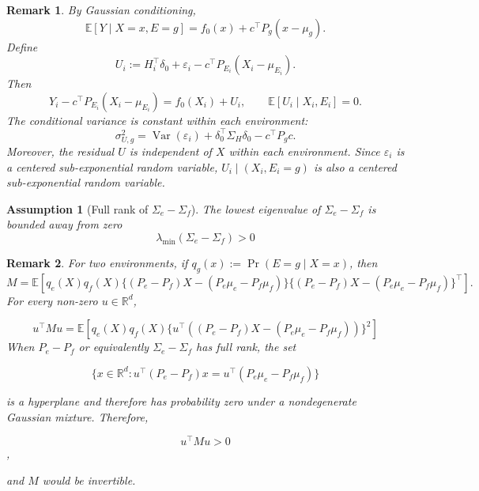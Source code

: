 \documentclass[11pt]{article}
\newtheorem{remark}{Remark}[section]
\newtheorem{assumption}{Assumption}
\newcommand{\R}{\mathbb{R}}
\newcommand{\E}{\mathbb{E}}
\newcommand{\eps}{\varepsilon}
\begin{document}
\begin{remark}
By Gaussian conditioning,
\begin{equation}
 \E[Y\mid X=x,E=g]=f_0(x)+c^\top P_g(x-\mu_g).
 \label{eq:conditional_mean_confounding}
\end{equation}
Define
\begin{equation}
 U_i:=H_i^\top\delta_0+\eps_i-c^\top P_{E_i}(X_i-\mu_{E_i}).
 \label{eq:corrected_error}
\end{equation}
Then
\[
 Y_i-c^\top P_{E_i}(X_i-\mu_{E_i})=f_0(X_i)+U_i,
 \qquad \E[U_i\mid X_i,E_i]=0.
\]
The conditional variance is constant within each environment:
\begin{equation}
 \sigma_{U,g}^2
 =\operatorname{Var}(\eps_i)+\delta_0^\top\Sigma_H\delta_0-c^\top P_gc.
 \label{eq:environment_variance}
\end{equation}
Moreover, the residual $U$ is independent of $X$ within each environment. Since $\eps_i$ is a centered sub-exponential random variable, $U_i\mid(X_i,E_i=g)$ is also a centered sub-exponential random variable.

\end{remark}

\begin{assumption} 
[Full rank of $\Sigma_e - \Sigma_f$]\label{assump:full_rank_of_cov_mat_diff}
The lowest eigenvalue of $\Sigma_e - \Sigma_f$ is bounded away from zero
\begin{equation}
 \lambda_{\min}(\Sigma_e - \Sigma_f) > 0
 \label{eq:full_rank_of_cov_mat_diff}
\end{equation}
\end{assumption}

\begin{remark}
For two environments, if $q_g(x):=\Pr(E=g\mid X=x)$, then
\[
 M=\E\!\left[q_e(X)q_f(X)\{(P_e-P_f)X -(P_e\mu_e - P_f\mu_f) \}\{(P_e-P_f)X -(P_e\mu_e - P_f\mu_f)\}^\top\right].
\]
\noindent
For every non-zero $u \in \R^d$,

\[u^\top M u = \E[q_e(X)q_f(X)\{u^\top\left((P_e-P_f)X -(P_e\mu_e - P_f\mu_f)\right)\}^2] \]
When $P_e-P_f$ or equivalently $\Sigma_e - \Sigma_f$ has full rank, the set

\[\{x \in \R^d: u^\top(P_e-P_f)x = u^\top(P_e\mu_e - P_f\mu_f)\}\]

is a hyperplane and therefore has probability zero under a nondegenerate Gaussian mixture. Therefore,

\[u^\top M u > 0\],

and $M$ would be invertible.


\end{remark}
\end{document}
